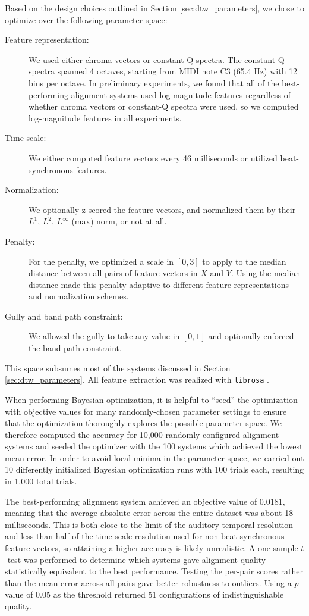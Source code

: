 Based on the design choices outlined in Section \ref{sec:dtw_parameters}, we chose to optimize over the following parameter space:
\begin{description}
\item[Feature representation:] We used either chroma vectors or constant-Q spectra.
The constant-Q spectra spanned 4 octaves, starting from MIDI note C3 (65.4 Hz) with 12 bins per octave.
In preliminary experiments, we found that all of the best-performing alignment systems used log-magnitude features regardless of whether chroma vectors or constant-Q spectra were used, so we computed log-magnitude features in all experiments.
\item[Time scale:] We either computed feature vectors every 46 milliseconds or utilized beat-synchronous features.
\item[Normalization:] We optionally z-scored the feature vectors, and normalized them by their $L^1$, $L^2$, $L^\infty$ (max) norm, or not at all.
\item[Penalty:] For the penalty, we optimized a scale in $[0, 3]$ to apply to the median distance between all pairs of feature vectors in $X$ and $Y$.
Using the median distance made this penalty adaptive to different feature representations and normalization schemes.
\item[Gully and band path constraint:] We allowed the gully to take any value in $[0, 1]$ and optionally enforced the band path constraint.
\end{description}
This space subsumes most of the systems discussed in Section \ref{sec:dtw_parameters}.
All feature extraction was realized with \texttt{librosa} \cite{mcfee2015librosa, mcfee2015librosa_scipy}.

When performing Bayesian optimization, it is helpful to ``seed'' the optimization with objective values for many randomly-chosen parameter settings to ensure that the optimization thoroughly explores the possible parameter space.
We therefore computed the accuracy for 10,000 randomly configured alignment systems and seeded the optimizer with the 100 systems which achieved the lowest mean error.
In order to avoid local minima in the parameter space, we carried out 10 differently initialized Bayesian optimization runs with 100 trials each, resulting in 1,000 total trials.

The best-performing alignment system achieved an objective value of $0.0181$, meaning that the average absolute error across the entire dataset was about 18 milliseconds.
This is both close to the limit of the auditory temporal resolution and less than half of the time-scale resolution used for non-beat-synchronous feature vectors, so attaining a higher accuracy is likely unrealistic.
A one-sample $t$-test was performed to determine which systems gave alignment quality statistically equivalent to the best performance.
Testing the per-pair scores rather than the mean error across all pairs gave better robustness to outliers.
Using a $p$-value of $0.05$ as the threshold returned 51 configurations of indistinguishable quality.

